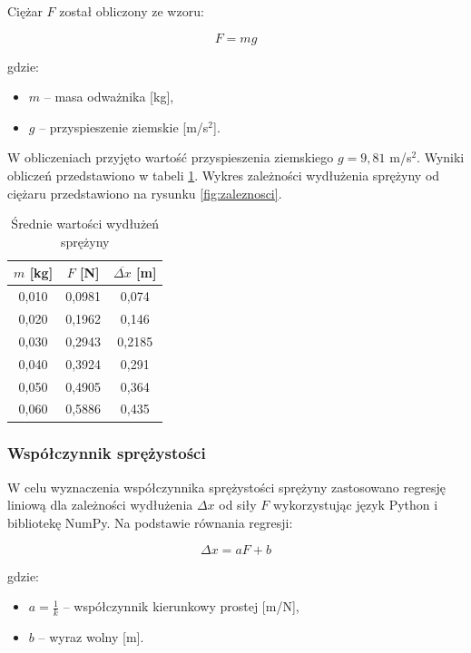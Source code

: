 \documentclass[a4paper,12pt]{article}
\begin{document}
Ciężar $F$ został obliczony ze wzoru:

\begin{equation*}
    F = mg
\end{equation*}

gdzie:
\begin{itemize}
    \setlength{\itemsep}{0em}
    \item $m$ -- masa odważnika [kg],
    \item $g$ -- przyspieszenie ziemskie [m/s$^2$].
\end{itemize}

W obliczeniach przyjęto wartość przyspieszenia ziemskiego $g = 9,81$ m/s$^2$.
Wyniki obliczeń przedstawiono w tabeli \ref{tab:wydluzenia}.
Wykres zależności wydłużenia sprężyny od ciężaru przedstawiono na rysunku \ref{fig:zaleznosci}.

\begin{table}[H]
    \centering
    \begin{tabular}{|c|c|c|}
        \hline
        $m$ [kg] & $F$ [N] & $\overline{\Delta x}$ [m] \\
        \hline
        0,010 & 0,0981 & 0,074 \\
        0,020 & 0,1962 & 0,146 \\
        0,030 & 0,2943 & 0,2185 \\
        0,040 & 0,3924 & 0,291 \\
        0,050 & 0,4905 & 0,364 \\
        0,060 & 0,5886 & 0,435 \\
        \hline
    \end{tabular}
    \caption{Średnie wartości wydłużeń sprężyny}
    \label{tab:wydluzenia}
\end{table}

\subsubsection{Współczynnik sprężystości}

W celu wyznaczenia współczynnika sprężystości sprężyny zastosowano regresję liniową dla zależności wydłużenia $\Delta x$ od siły $F$ wykorzystując język Python i bibliotekę NumPy. Na podstawie równania regresji:

\begin{equation*}
    \Delta x = aF + b
\end{equation*}

gdzie:
\begin{itemize}
    \setlength{\itemsep}{0em}
    \item $a = \frac{1}{k}$ -- współczynnik kierunkowy prostej [m/N],
    \item $b$ -- wyraz wolny [m].
\end{itemize}
\end{document}
